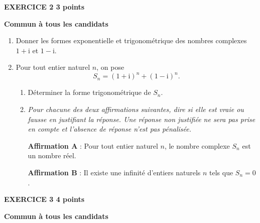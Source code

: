 \documentclass[10pt,a4paper]{article}
\begin{document}
\vspace{0,5cm}

\textbf{EXERCICE 2 \hfill 3 points}

\textbf{Commun à tous les candidats}

\medskip

\begin{enumerate}
\item Donner les formes exponentielle et trigonométrique des nombres complexes $1 + \text{i}$ et $1 - \text{i}$.
\item  Pour tout entier naturel $n$, on pose 
\[S_n = (1 + \text{i})^n + (1 - \text{i})^n.\]

	\begin{enumerate}
		\item Déterminer la forme trigonométrique de $S_n$.
		\item \emph{Pour chacune des deux affirmations suivantes, dire si elle est vraie ou fausse en justifiant la réponse. Une réponse non justifiée ne sera pas prise en compte et l'absence de réponse n'est
pas pénalisée.}
		
\smallskip
		
\textbf{Affirmation A }: Pour tout entier naturel $n$, le nombre complexe $S_n$ est un nombre réel.
		
\textbf{Affirmation B }: Il existe une infinité d'entiers naturels $n$ tels que $S_n = 0$.
 	\end{enumerate}
\end{enumerate}

\newpage

\textbf{EXERCICE 3 \hfill 4 points}

\textbf{Commun à tous les candidats}

\medskip
\end{document}

